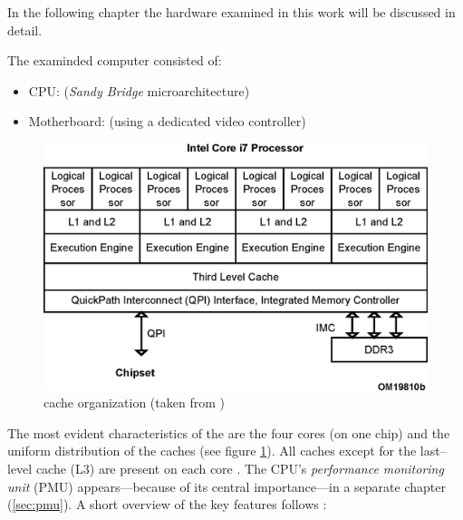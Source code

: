 \label{sec:technical-prerequisites}

In the following chapter the hardware examined in this work will be discussed in
detail.


\label{sec:hw-products}

The examinded computer consisted of:

\begin{itemize}

\item CPU: \JWPLcpu{} (\emph{San\-dy Bridge} microarchitecture)

\item Motherboard: \JWPLboard{} (using a dedicated video controller)

\end{itemize}


\label{sec:sandy-bridge}

\begin{figure}
  \centering
    \includegraphics[width=\textwidth]{fig/sandy-bridge-layout.eps}
  \caption{\JWPcpu{} cache organization (taken from \cite{intel2011softdev1})}
  \label{fig:cache-orga}
\end{figure}

The most evident characteristics of the \JWPcpu{} are the four cores (on one
chip) and the uniform distribution of the caches (see figure
\ref{fig:cache-orga}). All caches except for the last--level cache (L3) are
present on each core \cite{fog11}. The CPU's \emph{performance monitoring unit}
(PMU) appears---because of its central importance---in a separate chapter
(\ref{sec:pmu}). A short overview of the key features follows
\cite{intel2011spec}:

